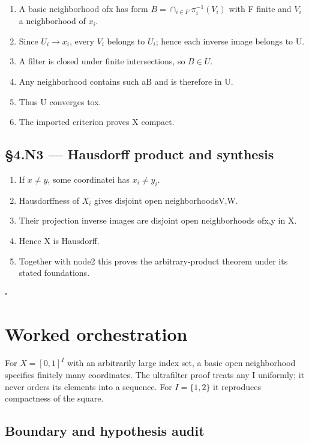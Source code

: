\documentclass[preprint,12pt,aps,pra,showkeys,amsmath,amssymb,superscriptaddress,floatfix]{revtex4-2}
\theoremstyle{definition}
\theoremstyle{remark}
\begin{document}
\begin{enumerate}
\def\labelenumi{\arabic{enumi}.}
\item
  A basic neighborhood ofx has form \(B=\cap _{i\in F}\pi _i^{-1}(V_i)\)
  with F finite and \(V_i\) a neighborhood of \(x_i\).
\item
  Since \(U_i\to x_i\), every \(V_i\) belongs to \(U_i\); hence each
  inverse image belongs to U.
\item
  A filter is closed under finite intersections, so \(B\in U\).
\item
  Any neighborhood contains such aB and is therefore in U.
\item
  Thus U converges tox.
\item
  The imported criterion proves X compact.
\end{enumerate}

\subsection{§4.N3 --- Hausdorff product and
synthesis}\label{n3-hausdorff-product-and-synthesis}

\begin{enumerate}
\def\labelenumi{\arabic{enumi}.}
\item
  If \(x\ne y\), some coordinatei has \(x_i\ne y_i\).
\item
  Hausdorffness of \(X_i\) gives disjoint open neighborhoodsV,W.
\item
  Their projection inverse images are disjoint open neighborhoods ofx,y
  in X.
\item
  Hence X is Hausdorff.
\item
  Together with node2 this proves the arbitrary-product theorem under
  its stated foundations.
\end{enumerate}

\hfill$\square$

\section{Worked orchestration}

For \(X=[0,1]^I\) with an arbitrarily large index set, a basic open
neighborhood specifies finitely many coordinates. The ultrafilter proof
treats any I uniformly; it never orders its elements into a sequence.
For \(I=\{1,2\}\) it reproduces compactness of the square.

\subsection{Boundary and hypothesis audit}
\end{document}
